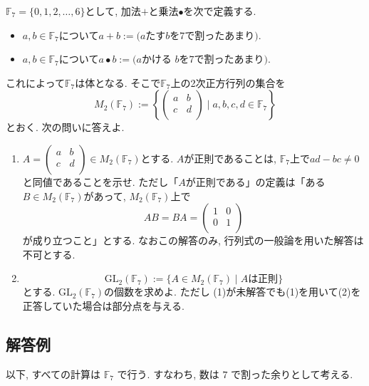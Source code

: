 \documentclass[uplatex,dvipdfmx,a4paper,14pt]{jsarticle}
\newcommand{\F}{\mathbb{F}}
\begin{document}
\begin{tcolorbox}[problemstyle,title=問題]

$\mathbb{F}_7=\{0,1 ,2, \ldots, 6\}$として,
  加法$+ $と乗法$\bullet$を次で定義する.
  \begin{itemize}
  \item $a, b \in \mathbb{F}_7$について$a+b:=\text{($a$たす$b$を$7$で割ったあまり)}$.
\item $a, b \in \mathbb{F}_7$について$a\bullet b:=\text{($a$かける $b$を$7$で割ったあまり)}$.
 \end{itemize}
これによって$\mathbb{F}_7$は体となる. そこで$\mathbb{F}_7$上の2次正方行列の集合を
 $$
 M_2(\mathbb{F}_7)
 :=\left\{ \begin{pmatrix}
a & b\\
c & d \\
\end{pmatrix}
\mid a,b,c,d \in \mathbb{F}_7 \right\}
 $$
 とおく. 次の問いに答えよ.
  \begin{enumerate}[label=(\arabic*)]
 \setlength{\parskip}{0cm}
  \setlength{\itemsep}{0cm}
  \item $A= \begin{pmatrix}
a & b\\
c & d \\
\end{pmatrix} \in  M_2(\mathbb{F}_7)$とする. $A$が正則であることは, $\mathbb{F}_7$上で$ad-bc \neq 0$と同値であることを示せ.
  ただし「$A$が正則である」の定義は「ある$B  \in  M_2(\mathbb{F}_7)$があって, $M_2(\mathbb{F}_7)$上で
  $$
  AB=BA=\begin{pmatrix}
1& 0\\
0 & 1 \\
\end{pmatrix}
  $$
  が成り立つこと」とする. なおこの解答のみ, 行列式の一般論を用いた解答は不可とする.
  \item
  $$
   \mathrm{GL}_2(\mathbb{F}_7 ):=
   \{A \in  M_2(\mathbb{F}_7) \mid \text{$A$は正則}\}
  $$
  とする.
  $   \mathrm{GL}_2(\mathbb{F}_7 )$の個数を求めよ.
ただし (1)が未解答でも(1)を用いて(2)を正答していた場合は部分点を与える.
  \end{enumerate}

\end{tcolorbox}

\subsection*{解答例}

以下, すべての計算は $\F_7$ で行う. すなわち, 数は $7$ で割った余りとして考える.
\end{document}
